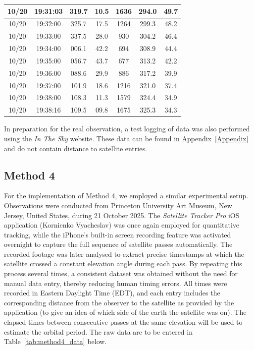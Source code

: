 \documentclass{article}
\begin{document}
\begin{table}[H]
\begin{tabular}{|c|c|c|c|c|c|c|}
        10/20 & 19:31:03 & 319.7 & 10.5 & 1636 & 294.0 & 49.7 \\ \hline
        10/20 & 19:32:00 & 325.7 & 17.5 & 1264 & 299.3 & 48.2 \\ \hline
        10/20 & 19:33:00 & 337.5 & 28.0 &  930 & 304.2 & 46.4 \\ \hline
        10/20 & 19:34:00 & 006.1 & 42.2 &  694 & 308.9 & 44.4 \\ \hline
        10/20 & 19:35:00 & 056.7 & 43.7 &  677 & 313.2 & 42.2 \\ \hline
        10/20 & 19:36:00 & 088.6 & 29.9 &  886 & 317.2 & 39.9 \\ \hline
        10/20 & 19:37:00 & 101.9 & 18.6 & 1216 & 321.0 & 37.4 \\ \hline
        10/20 & 19:38:00 & 108.3 & 11.3 & 1579 & 324.4 & 34.9 \\ \hline
        10/20 & 19:38:16 & 109.5 & 09.8 & 1675 & 325.3 & 34.3 \\ \hline
    \end{tabular}
\end{table}

In preparation for the real observation, a test logging of data was also performed using the \textit{In The Sky} website. These data can be found in Appendix~\ref{Appendix} and do not contain distance to satellite entries.

\subsection{Method 4}

For the implementation of Method 4, we employed a similar experimental setup. Observations were conducted from Princeton University Art Museum, New Jersey, United States, during 21 October 2025. The \textit{Satellite Tracker Pro} iOS application (Kornienko Vyacheslav) was once again employed for quantitative tracking, while the iPhone’s built-in screen recording feature was activated overnight to capture the full sequence of satellite passes automatically. The recorded footage was later analysed to extract precise timestamps at which the satellite crossed a constant elevation angle during each pass. By repeating this process several times, a consistent dataset was obtained without the need for manual data entry, thereby reducing human timing errors. All times were recorded in Eastern Daylight Time (EDT), and each entry includes the corresponding distance from the observer to the satellite as provided by the application (to give an idea of which side of the earth the satellite was on). The elapsed times between consecutive passes at the same elevation will be used to estimate the orbital period. The raw data are to be entered in Table~\ref{tab:method4_data} below.
\end{document}
